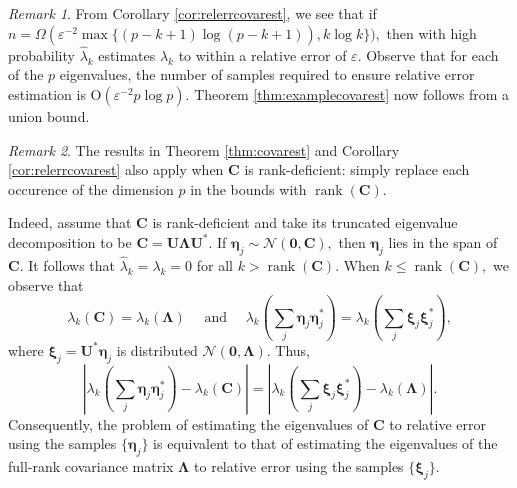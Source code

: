 \documentclass[11pt,letterpaper,twoside,reqno,nosumlimits]{amsart}
\renewcommand{\star}{*}
\newcommand{\mat}[1]{\ensuremath{\bm{#1}}} %
\renewcommand{\vec}[1]{\ensuremath{\bm{#1}}}
\DeclareMathOperator{\rank}{rank}
\theoremstyle{remark}
\newtheorem{remark}{Remark}
\numberwithin{equation}{section}
\numberwithin{thm}{section}
\numberwithin{prop}{section}
\numberwithin{defn}{section}
\numberwithin{remark}{section}
\begin{document}

\begin{remark}
From Corollary \ref{cor:relerrcovarest}, we see that if $n = \Omega( \varepsilon^{-2} \max \{ (p-k+1)\log(p-k+1)), k \log k \} ),$ then with high probability $\hat{\lambda}_k$ estimates $\lambda_k$ to within a relative error of $\varepsilon.$ Observe that for each of the $p$ eigenvalues, the number of samples required to ensure relative error estimation is $\mathrm{O}(\varepsilon^{-2} p \log p).$ Theorem \ref{thm:examplecovarest} now follows from a union bound.
\end{remark}

\begin{remark}
The results in Theorem \ref{thm:covarest} and Corollary \ref{cor:relerrcovarest} also apply when $\mat{C}$ is rank-deficient: simply replace each occurence of the dimension $p$ in the bounds with $\rank(\mat{C}).$ 

Indeed, assume that $\mat{C}$ is rank-deficient and take its truncated eigenvalue decomposition to be $\mat{C} = \mat{U} \mat{\Lambda} \mat{U}^\star.$ If $\vec{\eta}_j \sim \mathcal{N}(\vec{0}, \mat{C}),$ then $\vec{\eta}_j$ lies in the span of $\mat{C}.$ It follows that $\hat{\lambda}_k = \lambda_k = 0$ for all $k > \rank(\mat{C}).$ When $k \leq \rank(\mat{C}),$ we observe that  
\[
\lambda_k(\mat{C}) = \lambda_k(\mat{\Lambda}) \quad \text{ and } \quad \lambda_k\left(\sum_j \vec{\eta}_j \vec{\eta}_j^\star \right) = \lambda_k\left( \sum_j \vec{\xi}_j \vec{\xi}_j^\star \right),
\]
where $\vec{\xi}_j = \mat{U}^\star \vec{\eta}_j$ is distributed $\mathcal{N}(\vec{0}, \mat{\Lambda}).$ Thus,
\[
\left| \lambda_k\left(\sum_j \vec{\eta}_j \vec{\eta}_j^\star \right) - \lambda_k(\mat{C}) \right| =
\left| \lambda_k\left( \sum_j \vec{\xi}_j \vec{\xi}_j^\star \right) - \lambda_k(\mat{\Lambda}) \right|.
\]
Consequently, the problem of estimating the eigenvalues of $\mat{C}$ to relative error using the samples $\{\vec{\eta}_j\}$ is equivalent to that of estimating the eigenvalues of the full-rank covariance matrix $\mat{\Lambda}$ to relative error using the samples $\{\vec{\xi}_j\}.$
\end{remark}
\end{document}
